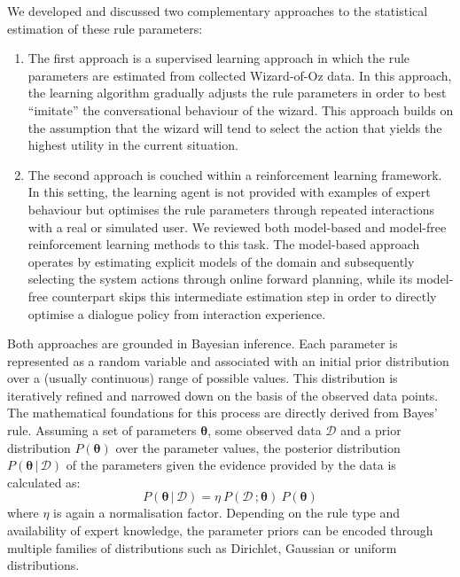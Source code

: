 We developed and discussed two complementary approaches to the statistical estimation of these rule parameters:
\begin{enumerate}
\item The first approach is a supervised learning approach in which the rule parameters are estimated from collected Wizard-of-Oz data.  In this approach, the learning algorithm gradually adjusts the rule parameters in order to best ``imitate'' the conversational behaviour of the wizard. This approach builds on the assumption that the wizard will tend to select the action that yields the highest utility in the current situation. 
\item The second approach is couched within a reinforcement learning framework.  In this setting, the learning agent is not provided with examples of expert behaviour but optimises the rule parameters through repeated interactions with a real or simulated user. We reviewed both model-based and model-free reinforcement learning methods to this task.  The model-based approach operates by estimating explicit models of the domain and subsequently selecting the system actions through online forward planning, while its model-free counterpart skips this intermediate estimation step in order to directly optimise a dialogue policy from interaction experience. 
\end{enumerate}

Both approaches are grounded in Bayesian inference.  Each parameter is represented as a random variable and associated with an initial prior distribution over a (usually continuous) range of possible values. This distribution is iteratively refined and narrowed down on the basis of the observed data points. The mathematical foundations for this process are directly derived from Bayes' rule. Assuming a set of parameters $\boldsymbol\theta$, some observed data $\mathcal{D}$ and a prior distribution $P(\boldsymbol\theta)$ over the parameter values, the posterior distribution $P(\boldsymbol\theta \, | \, \mathcal{D})$ of the parameters given the evidence provided by the data is calculated as:
\begin{equation}
P(\boldsymbol\theta \, | \, \mathcal{D}) = \eta \ P(\mathcal{D} \,; \boldsymbol\theta) \ P(\boldsymbol\theta)
\end{equation}
where $\eta$ is again a normalisation factor. Depending on the rule type and availability of expert knowledge, the parameter priors can be encoded through multiple families of distributions such as Dirichlet, Gaussian or uniform distributions. 

